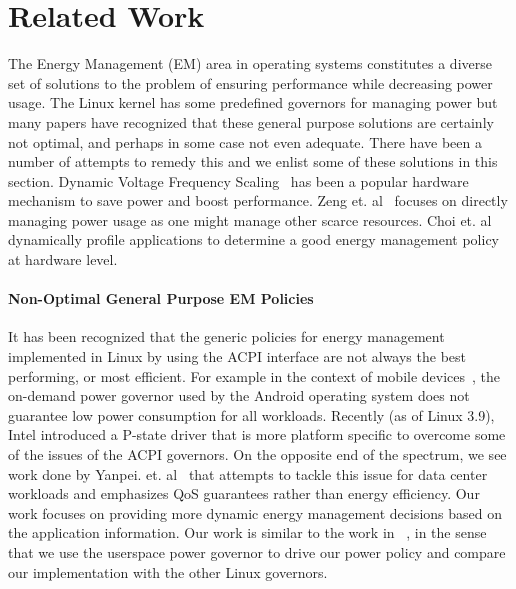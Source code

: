\section{Related Work}\label{sec:rel}

The Energy Management (EM) area in operating systems constitutes a diverse set of solutions to the problem of ensuring performance while decreasing power usage. 
The Linux kernel has some predefined governors for managing power but many papers have recognized that these general purpose solutions are certainly not optimal, 
and perhaps in some case not even adequate. 
There have been a number of attempts to remedy this and we enlist some of these solutions in this section. Dynamic Voltage Frequency Scaling~\cite{dvfs} has been a 
popular hardware mechanism to save power and boost performance. Zeng et. al~\cite{ecos} focuses on directly managing power usage as one might manage other scarce resources. 
Choi et. al~\cite{decomp} dynamically profile applications to determine a good energy management policy at hardware level. 

\paragraph{Non-Optimal General Purpose EM Policies} It has been recognized that the generic policies for energy management 
implemented in Linux by using the ACPI interface are not always the best performing, or most efficient. For example in the 
context of mobile devices~\cite{and-dvfs}, the on-demand power governor used by the Android operating system does not guarantee 
low power consumption for all workloads. Recently (as of Linux 3.9), Intel introduced a P-state driver that is more platform specific 
to overcome some of the issues of the ACPI governors. On the opposite end of the spectrum, we see work done by Yanpei. et. al~\cite{sleepscale} that 
attempts to tackle this issue for data center workloads and emphasizes QoS guarantees rather than energy efficiency. Our work focuses on 
providing more dynamic energy management decisions based on the application information. Our work is similar to the work 
in ~\cite{and-dvfs}, in the sense that we use the userspace power governor to drive our power policy and compare our implementation with 
the other Linux governors. 

